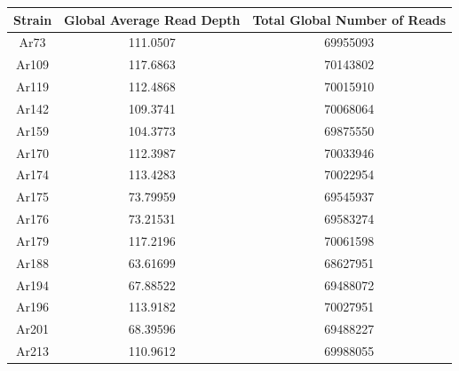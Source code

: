 \documentclass[../main.tex]{subfiles}
\begin{document}
%
%
\begin{table}[H]
\begin{center}
	 \label{tab:CV_res}
\begin{tabular}{ |c|c|c| }
		\hline
		Strain & Global Average Read Depth & Total Global Number of Reads \\
		\hline
		Ar73 & 111.0507 & 69955093\\
		\hline
		Ar109 & 117.6863 & 70143802\\
		\hline
		Ar119 & 112.4868 & 70015910\\
		\hline
		Ar142 & 109.3741 & 70068064\\
		\hline
		Ar159 & 104.3773 & 69875550\\
		\hline
		Ar170 & 112.3987 & 70033946\\
		\hline
		Ar174 & 113.4283 & 70022954\\
		\hline
		Ar175 & 73.79959 & 69545937\\
		\hline
		Ar176 & 73.21531 & 69583274\\
		\hline
		Ar179 & 117.2196 & 70061598\\
		\hline
		Ar188 & 63.61699 & 68627951\\
		\hline
		Ar194 & 67.88522 & 69488072\\
		\hline
		Ar196 & 113.9182 & 70027951\\
		\hline
		Ar201 & 68.39596 & 69488227\\
		\hline
		Ar213 & 110.9612 & 69988055\\
		\hline
\end{tabular}
\end{center}
\end{table}
\end{document}
